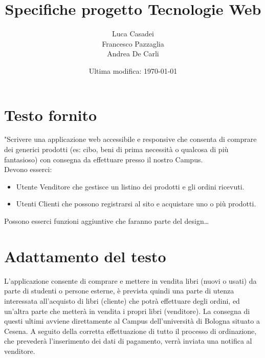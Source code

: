 \documentclass[a4paper]{article}
\author{Luca Casadei\\Francesco Pazzaglia\\Andrea De Carli}
\date{Ultima modifica: \today}
\title{\textbf{Specifiche progetto Tecnologie Web}}
\begin{document}
	\maketitle
	\tableofcontents
	\section{Testo fornito}
	"Scrivere una applicazione web accessibile e responsive che consenta di comprare dei generici prodotti (es:	cibo, beni di prima necessità o qualcosa di più fantasioso) con consegna da effettuare presso il nostro Campus.\\
	Devono esserci:
	\begin{itemize}
		\item Utente Venditore che gestisce un listino dei prodotti e gli ordini ricevuti.
		\item Utenti Clienti che possono registrarsi al sito e acquistare uno o più prodotti.
	\end{itemize}
	Possono esserci funzioni aggiuntive che faranno parte del design\dots\quotedblbase
	\section{Adattamento del testo}
	L'applicazione consente di comprare e mettere in vendita libri (nuovi o usati) da parte di studenti o persone esterne, è prevista quindi una parte di utenza interessata all'acquisto di libri (cliente) che potrà effettuare degli ordini, ed un'altra parte che metterà in vendita i propri libri (venditore). La consegna di questi ultimi avviene direttamente al Campus dell'università di Bologna situato a Cesena. A seguito della corretta effettuazione di tutto il processo di ordinazione, che prevederà l'inserimento dei dati di pagamento, verrà inviata una notifica al venditore.\\
\end{document}
